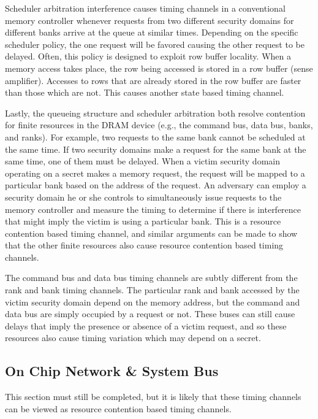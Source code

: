 Scheduler arbitration interference causes timing channels in a conventional 
memory controller whenever requests from two different security domains for 
different banks arrive at the queue at similar times. Depending on the specific 
scheduler policy, the one request will be favored causing the other request to 
be delayed. Often, this policy is designed to exploit row buffer locality. When 
a memory access takes place, the row being accessed is stored in a row buffer 
(sense amplifier). Accesses to rows that are already stored in the row buffer 
are faster than those which are not. This causes another state based timing 
channel.


Lastly, the queueing structure and scheduler arbitration both resolve 
contention for finite resources in the DRAM device (e.g., the command bus, data
bus, banks, and ranks).
For example, two requests to the same bank cannot be scheduled at the same 
time. If two security domains make a request for the same bank at the same 
time, one of them must be delayed.  When a victim security domain operating on 
a secret makes a memory request, the request will be mapped to a particular 
bank based on the address of the request. An adversary can employ a security 
domain he or she controls to simultaneously issue requests to the memory 
controller and measure the timing to determine if there is interference that 
might imply the victim is using a particular bank. This is a resource 
contention based timing channel, and similar arguments can be made to show that 
the other finite resources also cause resource contention based timing 
channels. 

The command bus and data bus timing channels are subtly different from the rank 
and bank timing channels. The particular rank and bank accessed by the victim 
security domain depend on the memory address, but the command and data bus are 
simply occupied by a request or not. These buses can still cause delays that 
imply the presence or absence of a victim request, and so these resources also 
cause timing variation which may depend on a secret.

\subsection{On Chip Network \& System Bus}
This section must still be completed, but it is likely that these timing 
channels can be viewed as resource contention based timing channels.
